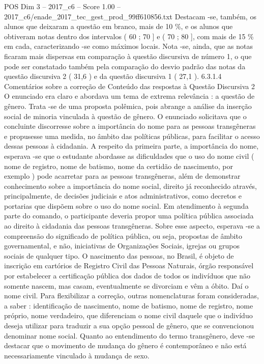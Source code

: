 \begin{textsample}{POS Dim 3 – 2017\_c6 – Score 1.00 – 2017\_c6/enade\_2017\_tec\_gest\_prod\_99ff610856.txt}
Destacam -se, também, os alunos que deixaram a questão em branco, mais de 10 \%, e os alunos que obtiveram notas dentro dos intervalos ( 60 ; 70 ] e ( 70 ; 80 ], com mais de 15 \% em cada, caracterizando -se como máximos locais.
Nota -se, ainda, que as notas ficaram mais dispersas em comparação à questão discursiva de número 1, o que pode ser constatado também pela comparação do desvio padrão das notas da questão discursiva 2 ( 31,6 ) e da questão discursiva 1 ( 27,1 ). 6.3.1.4 Comentários sobre a correção de Conteúdo das respostas à Questão Discursiva 2 O enunciado era claro e abordava um tema de extrema relevância : a questão de gênero.
Trata -se de uma proposta polêmica, pois abrange a análise da inserção social de minoria vinculada à questão de gênero.
O enunciado solicitava que o concluinte discorresse sobre a importância do nome para as pessoas transgêneras e propusesse uma medida, no âmbito das políticas públicas, para facilitar o acesso dessas pessoas à cidadania.
A respeito da primeira parte, a importância do nome, esperava -se que o estudante abordasse as dificuldades que o uso do nome civil ( nome de registro, nome de batismo, nome da certidão de nascimento, por exemplo ) pode acarretar para as pessoas transgêneras, além de demonstrar conhecimento sobre a importância do nome social, direito já reconhecido através, principalmente, de decisões judiciais e atos administrativos, como decretos e portarias que dispõem sobre o uso do nome social.
Em atendimento à segunda parte do comando, o participante deveria propor uma política pública associada ao direito à cidadania das pessoas transgêneras.
Sobre esse aspecto, esperava -se a compreensão do significado de política pública, ou seja, propostas de âmbito governamental, e não, iniciativas de Organizações Sociais, igrejas ou grupos sociais de qualquer tipo.
O nascimento das pessoas, no Brasil, é objeto de inscrição em cartórios de Registro Civil das Pessoas Naturais, órgão responsável por estabelecer a certificação pública dos dados de todos os indivíduos que não somente nascem, mas casam, eventualmente se divorciam e vêm a óbito.
Daí o nome civil.
Para flexibilizar a correção, outras nomenclaturas foram consideradas, a saber : identificação de nascimento, nome de batismo, nome de registro, nome próprio, nome verdadeiro, que diferenciam o nome civil daquele que o indivíduo deseja utilizar para traduzir a sua opção pessoal de gênero, que se convencionou denominar nome social.
Quanto ao entendimento do termo transgênero, deve -se destacar que o movimento de mudança do gênero é contemporâneo e não está necessariamente vinculado à mudança de sexo.

\end{textsample}
